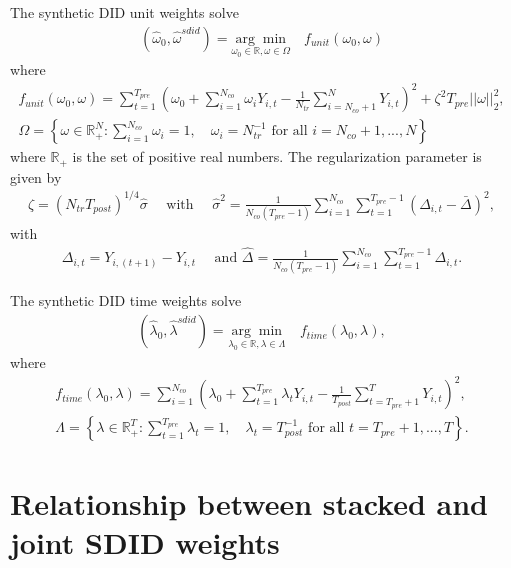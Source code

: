 \documentclass[12pt]{article}
\begin{document}
The synthetic DID unit weights solve
\begin{align}
    (\hat{\omega}_0,\hat{\omega}^{sdid}) = \underset{\omega_0 \in \mathbb{R},\omega \in \Omega}{\arg\min} \quad f_{unit}(\omega_0,\omega)
\end{align}
where
\begin{align*}
    f_{unit}(\omega_0,\omega) = \sum_{t=1}^{T_{pre}}\left(\omega_0 + \sum_{i=1}^{N_{co}} \omega_i Y_{i,t} - \frac{1}{N_{tr}} \sum_{i=N_{co}+1}^N Y_{i,t}\right)^2 + \zeta^2 T_{pre} ||\omega ||^2_2, \\
    \Omega = \left\lbrace \omega \in \mathbb{R}_+^N: \sum_{i=1}^{N_{co}}\omega_i = 1, \quad \omega_i = N_{tr}^{-1} \text{ for all } i = N_{co}+1,...,N \right\rbrace
\end{align*}
where \(\mathbb{R}_+\) is the set of positive real numbers.  The regularization parameter is given by
\begin{align} \label{eq:regularization}
    \zeta = (N_{tr}T_{post})^{1/4}\hat{\sigma} \quad \text{ with } \quad \hat{\sigma}^2 = \frac{1}{N_{co}(T_{pre} - 1)} \sum_{i=1}^{N_{co}}\sum_{t=1}^{T_{pre} - 1} (\Delta_{i,t} - \bar{\Delta})^2,
\end{align}
with
\begin{align*}
    \Delta_{i,t} = Y_{i,(t+1)} - Y_{i,t} \quad \text{ and } \hat{\Delta} = \frac{1}{N_{co}(T_{pre}-1)} \sum_{i=1}^{N_{co}}\sum_{t=1}^{T_{pre} - 1} \Delta_{i,t}.
\end{align*}

The synthetic DID time weights solve
\begin{align}
     (\hat{\lambda}_0,\hat{\lambda}^{sdid}) = \underset{\lambda_0 \in \mathbb{R},\lambda \in \Lambda}{\arg\min} \quad f_{time}(\lambda_0,\lambda),
\end{align}
where
\begin{align*}
    f_{time}(\lambda_0,\lambda) =  \sum_{i=1}^{N_{co}}\left( \lambda _0 + \sum_{t=1}^{T_{pre}} \lambda_t Y_{i,t} - \frac{1}{T_{post}}\sum_{t=T_{pre}+1}^T Y_{i,t} \right)^2, \\
    \Lambda = \left\lbrace \lambda \in \mathbb{R}_+^{T}: \sum_{t=1}^{T_{pre}} \lambda_t = 1, \quad \lambda_t = T^{-1}_{post} \text{ for all } t = T_{pre}+1,...,T \right\rbrace.
\end{align*}

\section{Relationship between stacked and joint SDID weights} \label{app:lseproof}
\end{document}
